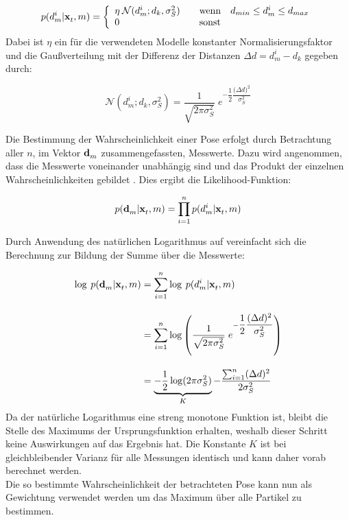 \begin{equation}
p(d_m^i|\mathbf{x}^{}_{t},m) = \left\lbrace\begin{array}{ll}
\eta \: \mathcal{N}(d_m^i;d_k,\sigma_S^2) & \quad \mathrm{wenn} \quad d_{min}\leq d_m^i \leq d_{max} \\
0 & \quad \mathrm{sonst}
\end{array}
\right.
\end{equation}
Dabei ist $\eta$ ein für die verwendeten Modelle konstanter Normalisierungsfaktor und die Gaußverteilung mit der Differenz der Distanzen $\Delta d = d_m^i-d_k$  gegeben durch:

\begin{equation}
\mathcal{N}(d_m^i;d_k,\sigma_S^2) = \frac{1}{\sqrt{2\pi\sigma_S^2}} \; e^{-\dfrac{1}{2}\dfrac{{(\Delta d})^2}{\sigma_S^2}}
\end{equation}

Die Bestimmung der Wahrscheinlichkeit einer Pose erfolgt durch Betrachtung aller $n$, im Vektor $\mathbf{d}^{}_{m}$ zusammengefassten, Messwerte. Dazu wird angenommen, dass die Messwerte voneinander unabhängig sind und das Produkt der einzelnen Wahrscheinlichkeiten gebildet \cite{Hornung2010}. Dies ergibt die Likelihood-Funktion:

\begin{equation}
\label{eq.likelihood}
p(\mathbf{d}^{}_{m}|\mathbf{x}^{}_{t},m) = \prod_{i=1}^{n}p(d_m^i|\mathbf{x}^{}_{t},m)
\end{equation}

Durch Anwendung des natürlichen Logarithmus auf  vereinfacht sich die Berechnung zur Bildung der Summe über die Messwerte:

\begin{equation}
\begin{split}
\log \: p(\mathbf{d}^{}_{m}|\mathbf{x}^{}_{t},m) & = \sum_{i=1}^{n}\log\: p(d_m^i|\mathbf{x}^{}_{t},m) \\[1em]
& = \sum_{i=1}^{n}\log \left( \frac{1}{\sqrt{2\pi\sigma_S^2}} \; e^{-\dfrac{1}{2}\dfrac{{(\Delta d})^2}{\sigma_S^2}} \right)\\[1em]
& = \underbrace{-\frac{1}{2}\log(2\pi\sigma_S^2)}_K-\dfrac{\sum_{i=1}^{n}(\Delta d)^2}{2\sigma_S^2}
\end{split}
\end{equation}
Da der natürliche Logarithmus eine streng monotone Funktion ist, bleibt die Stelle des Maximums der Ursprungsfunktion erhalten, weshalb dieser Schritt keine Auswirkungen auf das Ergebnis hat. Die Konstante $K$ ist bei gleichbleibender Varianz für alle Messungen identisch und kann daher vorab berechnet werden.\\
Die so bestimmte Wahrscheinlichkeit der betrachteten Pose kann nun als Gewichtung verwendet werden um das Maximum über alle Partikel zu bestimmen. 

